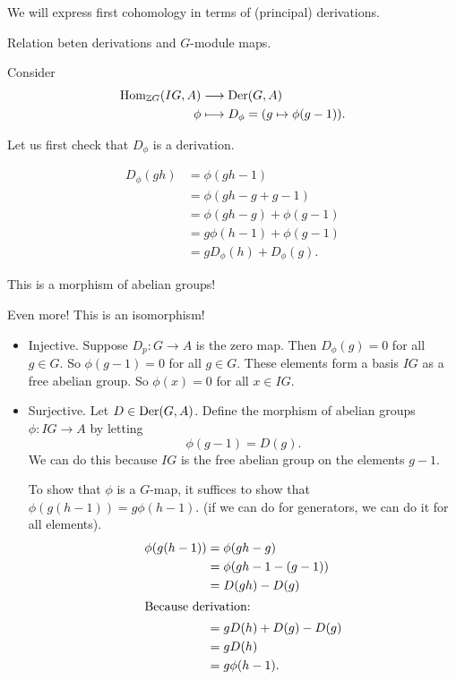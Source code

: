 
We will express first cohomology in terms of (principal) derivations.

Relation beten derivations and $G$-module maps.

Consider
\begin{align*}
    \operatorname{Hom}_{\mathbb{Z} G}(IG, A) &\longrightarrow \operatorname{Der}(G,A) \\
    \phi &\longmapsto D_\phi = (g \mapsto \phi(g-1))
.\end{align*}

Let us first check that $D_\phi$ is a derivation.

 \begin{align*}
     D_\phi(gh) &= \phi(gh-1)\\
            &= \phi(gh-g + g - 1)\\
            &= \phi(gh - g)  + \phi(g-1)\\
            &= g \phi(h-1) + \phi(g-1)\\
            &= g D_\phi(h) + D_\phi(g)
.\end{align*} 

This is a morphism of abelian groups!

Even more! This is an isomorphism!

\begin{itemize}
    \item Injective.
        Suppose $D_p: G \to  A$ is the zero map.
        Then $D_\phi(g) = 0$ for all  $g \in G$.
        So $\phi(g-1) = 0$ for all  $g \in G$.
These elements form a basis $IG$ as a free abelian group.
So  $\phi(x) = 0$ for all  $x \in IG$.

    \item Surjective.
        Let $D \in \operatorname{Der}(G, A)$.
        Define the morphism of abelian groups $\phi: IG \to  A$ by letting
        \[
            \phi(g-1) = D(g)
        .\] 
        We can do this because $IG$ is the free abelian group on the elements $g-1$.

        To show that $\phi$ is a $G$-map, it suffices to show that $\phi(g(h-1)) = g\phi(h-1)$.
        (if we can do for generators, we can do it for all elements).
         \begin{align*}
             \phi(g(h-1)) &= \phi(gh - g)\\
                          &= \phi(gh-1 - (g-1))\\
                          &= D(gh) - D(g)\\
                          \shortintertext{Because derivation:}
                          &= gD(h) + D(g) - D(g)\\
                          &= g D(h)\\
                          &= g \phi(h-1)
        .\end{align*}
\end{itemize}

